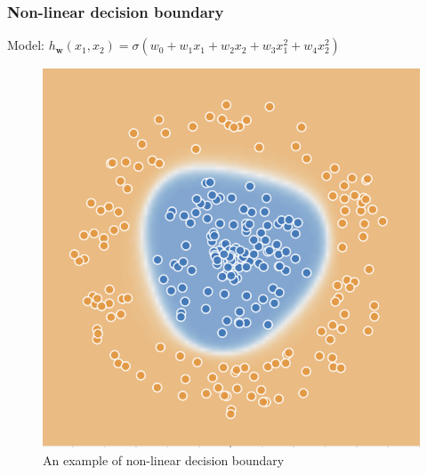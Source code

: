 \documentclass{beamer}
\begin{document}
	\begin{frame}
		\frametitle{Non-linear decision boundary}
		Model: $h_{\bm{w}}(x_1, x_2) = \sigma(w_0 + w_1 x_1 + w_2 x_2 + w_3 x_1^2 + w_4 x_2^2)$
		\begin{figure}
			\centering
			\includegraphics[scale=0.8]{images/non-linear-decision-boundary}
			\caption{An example of non-linear decision boundary}
		\end{figure}
	\end{frame}
\end{document}
